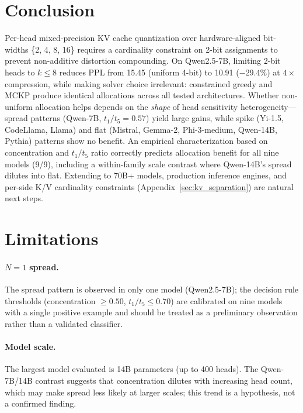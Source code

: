 \section{Conclusion}\label{sec:conclusion}

Per-head mixed-precision KV cache quantization over hardware-aligned bit-widths \{2, 4, 8, 16\} requires a cardinality constraint on 2-bit assignments to prevent non-additive distortion compounding.
On Qwen2.5-7B, limiting 2-bit heads to $k{\leq}8$ reduces PPL from 15.45 (uniform 4-bit) to 10.91 ($-$29.4\%) at $4\times$ compression, while making solver choice irrelevant: constrained greedy and MCKP produce identical allocations across all tested architectures.
Whether non-uniform allocation helps depends on the \emph{shape} of head sensitivity heterogeneity---spread patterns (Qwen-7B, $t_1/t_5{=}0.57$) yield large gains, while spike (Yi-1.5, CodeLlama, Llama) and flat (Mistral, Gemma-2, Phi-3-medium, Qwen-14B, Pythia) patterns show no benefit.
An empirical characterization based on concentration and $t_1/t_5$ ratio correctly predicts allocation benefit for all nine models (9/9), including a within-family scale contrast where Qwen-14B's spread dilutes into flat.
Extending to 70B+ models, production inference engines, and per-side K/V cardinality constraints (Appendix~\ref{sec:kv_separation}) are natural next steps.

\section*{Limitations}

\paragraph{$N{=}1$ spread.}
The spread pattern is observed in only one model (Qwen2.5-7B); the decision rule thresholds (concentration $\geq 0.50$, $t_1/t_5 \leq 0.70$) are calibrated on nine models with a single positive example and should be treated as a preliminary observation rather than a validated classifier.

\paragraph{Model scale.}
The largest model evaluated is 14B parameters (up to 400 heads). The Qwen-7B/14B contrast suggests that concentration dilutes with increasing head count, which may make spread less likely at larger scales; this trend is a hypothesis, not a confirmed finding.

